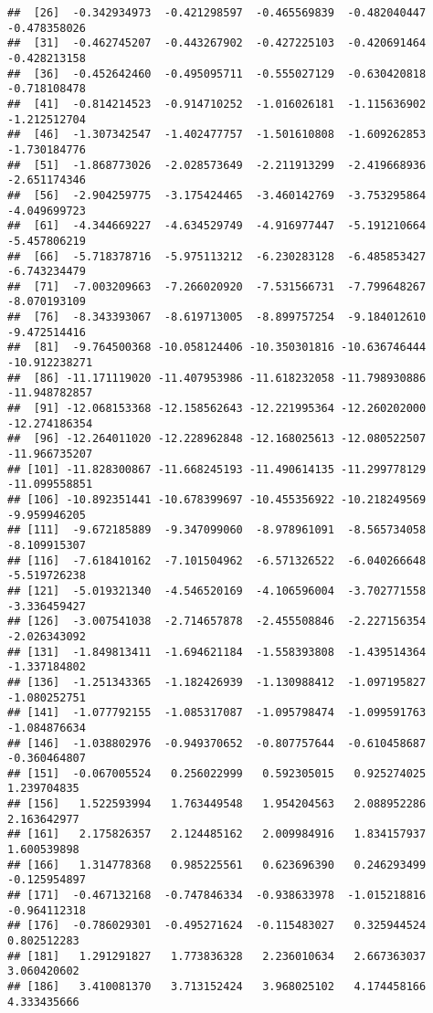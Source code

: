 \documentclass[
]{article}
\begin{document}
\begin{verbatim}
##  [26]  -0.342934973  -0.421298597  -0.465569839  -0.482040447  -0.478358026
##  [31]  -0.462745207  -0.443267902  -0.427225103  -0.420691464  -0.428213158
##  [36]  -0.452642460  -0.495095711  -0.555027129  -0.630420818  -0.718108478
##  [41]  -0.814214523  -0.914710252  -1.016026181  -1.115636902  -1.212512704
##  [46]  -1.307342547  -1.402477757  -1.501610808  -1.609262853  -1.730184776
##  [51]  -1.868773026  -2.028573649  -2.211913299  -2.419668936  -2.651174346
##  [56]  -2.904259775  -3.175424465  -3.460142769  -3.753295864  -4.049699723
##  [61]  -4.344669227  -4.634529749  -4.916977447  -5.191210664  -5.457806219
##  [66]  -5.718378716  -5.975113212  -6.230283128  -6.485853427  -6.743234479
##  [71]  -7.003209663  -7.266020920  -7.531566731  -7.799648267  -8.070193109
##  [76]  -8.343393067  -8.619713005  -8.899757254  -9.184012610  -9.472514416
##  [81]  -9.764500368 -10.058124406 -10.350301816 -10.636746444 -10.912238271
##  [86] -11.171119020 -11.407953986 -11.618232058 -11.798930886 -11.948782857
##  [91] -12.068153368 -12.158562643 -12.221995364 -12.260202000 -12.274186354
##  [96] -12.264011020 -12.228962848 -12.168025613 -12.080522507 -11.966735207
## [101] -11.828300867 -11.668245193 -11.490614135 -11.299778129 -11.099558851
## [106] -10.892351441 -10.678399697 -10.455356922 -10.218249569  -9.959946205
## [111]  -9.672185889  -9.347099060  -8.978961091  -8.565734058  -8.109915307
## [116]  -7.618410162  -7.101504962  -6.571326522  -6.040266648  -5.519726238
## [121]  -5.019321340  -4.546520169  -4.106596004  -3.702771558  -3.336459427
## [126]  -3.007541038  -2.714657878  -2.455508846  -2.227156354  -2.026343092
## [131]  -1.849813411  -1.694621184  -1.558393808  -1.439514364  -1.337184802
## [136]  -1.251343365  -1.182426939  -1.130988412  -1.097195827  -1.080252751
## [141]  -1.077792155  -1.085317087  -1.095798474  -1.099591763  -1.084876634
## [146]  -1.038802976  -0.949370652  -0.807757644  -0.610458687  -0.360464807
## [151]  -0.067005524   0.256022999   0.592305015   0.925274025   1.239704835
## [156]   1.522593994   1.763449548   1.954204563   2.088952286   2.163642977
## [161]   2.175826357   2.124485162   2.009984916   1.834157937   1.600539898
## [166]   1.314778368   0.985225561   0.623696390   0.246293499  -0.125954897
## [171]  -0.467132168  -0.747846334  -0.938633978  -1.015218816  -0.964112318
## [176]  -0.786029301  -0.495271624  -0.115483027   0.325944524   0.802512283
## [181]   1.291291827   1.773836328   2.236010634   2.667363037   3.060420602
## [186]   3.410081370   3.713152424   3.968025102   4.174458166   4.333435666

\end{verbatim}
\end{document}
